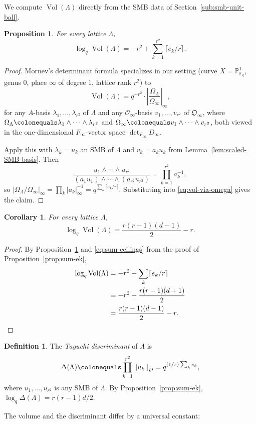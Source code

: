 \documentclass[12pt]{amsart}
\newtheorem{prop}[thm]{Proposition}
\newtheorem{cor}[thm]{Corollary}
\theoremstyle{definition}
\newtheorem{defn}[thm]{Definition}
\theoremstyle{remark}
\numberwithin{equation}{section}
\numberwithin{thm}{section}
\DeclareMathOperator{\Vol}{Vol}
\newcommand{\fO}{\mathfrak{O}}
\newcommand{\cO}{\mathcal{O}}
\newcommand{\F}{\mathbb{F}}
\newcommand{\PP}{\mathbb{P}}
\newcommand{\Fi}{F_\infty}
\newcommand{\La}{\Lambda}
\newcommand{\la}{\lambda}
\newcommand{\norm}[1]{\left\Vert#1\right\Vert}
\newcommand{\abs}[1]{\left|#1\right|}
\begin{document}
	We compute $\Vol(\La)$ directly from the SMB data of Section~\ref{sub:smb-unit-ball}.
	
	\begin{prop}\label{prop:vol-via-ceilings}
		For every lattice $\La$,
		\[
		\log_q \Vol(\La) = -r^2 + \sum_{k=1}^{r^2} \lceil e_k/r \rceil.
		\]
	\end{prop}
	
	\begin{proof}
		Mornev's determinant formula \cite[Lem.~1.5.3]{Mornev} specializes in our setting (curve $X = \PP^1_{\F_q}$, genus $0$, place $\infty$ of degree $1$, lattice rank $r^2$) to
		\begin{equation}\label{eq:vol-via-omega}
			\Vol(\La) = q^{-r^2}\cdot \abs{\frac{\Omega_\La}{\Omega_\infty}}_\infty,
		\end{equation}
		for any $A$-basis $\la_1, \ldots, \la_{r^2}$ of $\La$ and any $\cO_\infty$-basis $v_1, \ldots, v_{r^2}$ of $\fO_\infty$, where $\Omega_\La \colonequals \la_1 \wedge \cdots \wedge \la_{r^2}$ and $\Omega_\infty \colonequals v_1 \wedge \cdots \wedge v_{r^2}$, both viewed in the one-dimensional $\Fi$-vector space $\det_{\Fi} D_\infty$.
		
		Apply this with $\la_k = u_k$ an SMB of $\La$ and $v_k = a_k u_k$ from Lemma~\ref{lem:scaled-SMB-basis}. Then
		\[
		\frac{u_1 \wedge \cdots \wedge u_{r^2}}{(a_1 u_1) \wedge \cdots \wedge (a_{r^2}u_{r^2})} = \prod_{k=1}^{r^2} a_k^{-1},
		\]
		so $\abs{\Omega_\La/\Omega_\infty}_\infty = \prod_k \abs{a_k}_\infty^{-1} = q^{\sum_k \lceil e_k/r\rceil}$. Substituting into \eqref{eq:vol-via-omega} gives the claim.
	\end{proof}
	
	\begin{cor}\label{cor:vol-explicit}
		For every lattice $\La$,
		\[
		\log_q\Vol(\La) = \frac{r(r-1)(d-1)}{2} - r.
		\]
	\end{cor}
	
	\begin{proof}
		By Proposition~\ref{prop:vol-via-ceilings} and \eqref{eq:sum-ceilings} from the proof of Proposition~\ref{prop:sum-ek},
		\begin{align*}
		\log_q \Vol(\La) &= -r^2 + \sum_k \lceil e_k/r\rceil \\
		&= -r^2 + \frac{r(r-1)(d+1)}{2} \\
		&= \frac{r(r-1)(d-1)}{2} - r. \qedhere
		\end{align*}
	\end{proof}
	
	\begin{defn} The \textit{Taguchi discriminant} of $\La$ \cite[\S 4]{Taguchi} is 
	\[
	\Delta(\La) \colonequals \prod_{k=1}^{r^2}\norm{u_k}_D = q^{(1/r)\sum_k e_k},
	\]
	where $u_1, \ldots, u_{r^2}$ is any SMB of $\La$. By Proposition~\ref{prop:sum-ek}, $\log_q\Delta(\La) = r(r-1)d/2$. 
	\end{defn}
	The volume and the discriminant differ by a universal constant:
	
\end{document}
